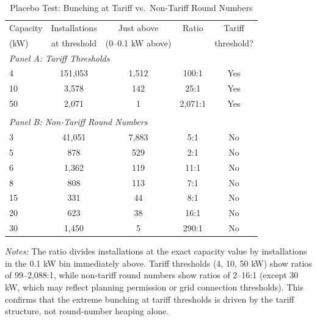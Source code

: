 \begin{table}[t]
\centering
\caption{Placebo Test: Bunching at Tariff vs.\ Non-Tariff Round Numbers}
\label{tab:placebo}
\begin{tabular}{lcccc}
\toprule
Capacity & Installations & Just above & Ratio & Tariff \\
(kW) & at threshold & (0--0.1 kW above) & & threshold? \\
\midrule
\multicolumn{5}{l}{\textit{Panel A: Tariff Thresholds}} \\
4 & 151,053 & 1,512 & 100:1 & Yes \\
10 & 3,578 & 142 & 25:1 & Yes \\
50 & 2,071 & 1 & 2,071:1 & Yes \\
 & & & & \\
\multicolumn{5}{l}{\textit{Panel B: Non-Tariff Round Numbers}} \\
3 & 41,051 & 7,883 & 5:1 & No \\
5 & 878 & 529 & 2:1 & No \\
6 & 1,362 & 119 & 11:1 & No \\
8 & 808 & 113 & 7:1 & No \\
15 & 331 & 44 & 8:1 & No \\
20 & 623 & 38 & 16:1 & No \\
30 & 1,450 & 5 & 290:1 & No \\
\bottomrule
\end{tabular}
\par\vspace{0.3em}\begin{flushleft}\small
\textit{Notes:} The ratio divides installations at the exact capacity value by installations in the 0.1 kW bin immediately above. Tariff thresholds (4, 10, 50 kW) show ratios of 99--2,088:1, while non-tariff round numbers show ratios of 2--16:1 (except 30 kW, which may reflect planning permission or grid connection thresholds). This confirms that the extreme bunching at tariff thresholds is driven by the tariff structure, not round-number heaping alone.
\end{flushleft}
\end{table}

